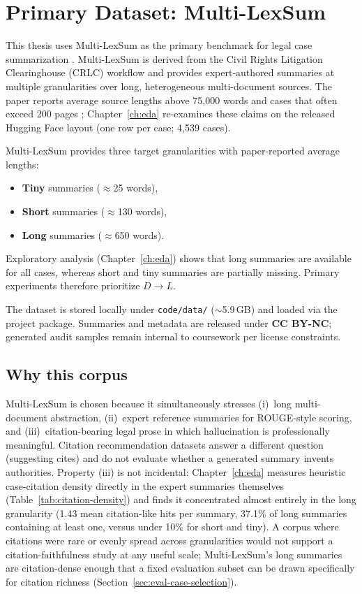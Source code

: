 \label{ch:data-source}
\section{Primary Dataset: Multi-LexSum}
\label{sec:data-multilexsum}

This thesis uses Multi-LexSum as the primary benchmark for legal case summarization \cite{shen2022multilexsum}. Multi-LexSum is derived from the Civil Rights Litigation Clearinghouse (CRLC) workflow and provides expert-authored summaries at multiple granularities over long, heterogeneous multi-document sources. The paper reports average source lengths above 75{,}000 words and cases that often exceed 200 pages \cite{shen2022multilexsum}; Chapter~\ref{ch:eda} re-examines these claims on the released Hugging Face layout (one row per case; 4{,}539 cases).

Multi-LexSum provides three target granularities with paper-reported average lengths:
\begin{itemize}
  \item \textbf{Tiny} summaries ($\approx$25 words),
  \item \textbf{Short} summaries ($\approx$130 words),
  \item \textbf{Long} summaries ($\approx$650 words).
\end{itemize}
Exploratory analysis (Chapter~\ref{ch:eda}) shows that long summaries are available for all cases, whereas short and tiny summaries are partially missing. Primary experiments therefore prioritize $D\rightarrow L$.

The dataset is stored locally under \texttt{code/data/} ($\sim$5.9\,GB) and loaded via the project package. Summaries and metadata are released under \textbf{CC BY-NC}; generated audit samples remain internal to coursework per license constraints.

\subsection{Why this corpus}
Multi-LexSum is chosen because it simultaneously stresses (i)~long multi-document abstraction, (ii)~expert reference summaries for ROUGE-style scoring, and (iii)~citation-bearing legal prose in which hallucination is professionally meaningful. Citation recommendation datasets \cite{farber2020citation} answer a different question (suggesting cites) and do not evaluate whether a generated summary invents authorities. Property (iii) is not incidental: Chapter~\ref{ch:eda} measures heuristic case-citation density directly in the expert summaries themselves (Table~\ref{tab:citation-density}) and finds it concentrated almost entirely in the long granularity (1.43 mean citation-like hits per summary, 37.1\% of long summaries containing at least one, versus under 10\% for short and tiny). A corpus where citations were rare or evenly spread across granularities would not support a citation-faithfulness study at any useful scale; Multi-LexSum's long summaries are citation-dense enough that a fixed evaluation subset can be drawn specifically for citation richness (Section~\ref{sec:eval-case-selection}).

